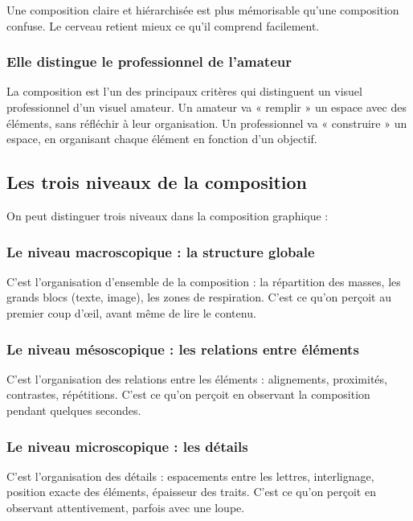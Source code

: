 Une composition claire et hiérarchisée est plus mémorisable qu'une composition confuse. Le cerveau retient mieux ce qu'il comprend facilement.

\subsubsection{Elle distingue le professionnel de l'amateur}

La composition est l'un des principaux critères qui distinguent un visuel professionnel d'un visuel amateur. Un amateur va « remplir » un espace avec des éléments, sans réfléchir à leur organisation. Un professionnel va « construire » un espace, en organisant chaque élément en fonction d'un objectif.

\subsection{Les trois niveaux de la composition}

On peut distinguer trois niveaux dans la composition graphique :

\subsubsection{Le niveau macroscopique : la structure globale}

C'est l'organisation d'ensemble de la composition : la répartition des masses, les grands blocs (texte, image), les zones de respiration. C'est ce qu'on perçoit au premier coup d'œil, avant même de lire le contenu.

\subsubsection{Le niveau mésoscopique : les relations entre éléments}

C'est l'organisation des relations entre les éléments : alignements, proximités, contrastes, répétitions. C'est ce qu'on perçoit en observant la composition pendant quelques secondes.

\subsubsection{Le niveau microscopique : les détails}

C'est l'organisation des détails : espacements entre les lettres, interlignage, position exacte des éléments, épaisseur des traits. C'est ce qu'on perçoit en observant attentivement, parfois avec une loupe.


